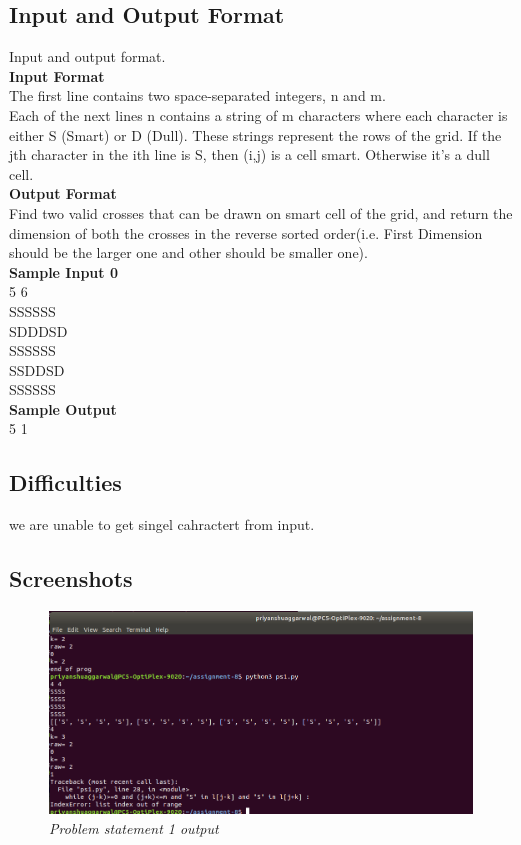 \documentclass[a4paper,12pt]{article}
\begin{document}
\newpage		

  
     \subsection{Input and Output Format}
     Input and output format.\\
     \textbf{Input Format}\\
     The first line contains two space-separated integers,  n and m. \\
   Each of the next  lines n contains a string of  m characters where each character is either S (Smart) or D (Dull). These strings represent the rows of the grid. If the jth character in the ith  line is S, then  (i,j) is a  cell smart. Otherwise it's a  dull cell.\\  
   
\textbf{Output Format}\\
   Find two valid crosses that can be drawn on smart cell of the grid, and return the dimension of both the crosses in the reverse sorted order(i.e. First Dimension should be the larger one and other should be smaller one).\\
   
   \textbf{Sample Input 0}\\
   5 6\\
SSSSSS\\
SDDDSD\\
SSSSSS\\
SSDDSD\\
SSSSSS\\

\textbf{Sample Output}\\
5 1
 \newpage  
 \subsection{Difficulties}
  we are unable to get singel cahractert from input.
 
        \subsection{Screenshots}
      \begin{figure}[h!]     
       	\centering
       	\vspace{-2mm}
		\includegraphics[scale=.45]{ps1}
		\vspace{-7mm}
		\caption{\textit{Problem statement 1 output}}
		\end{figure}
		
\end{document}
